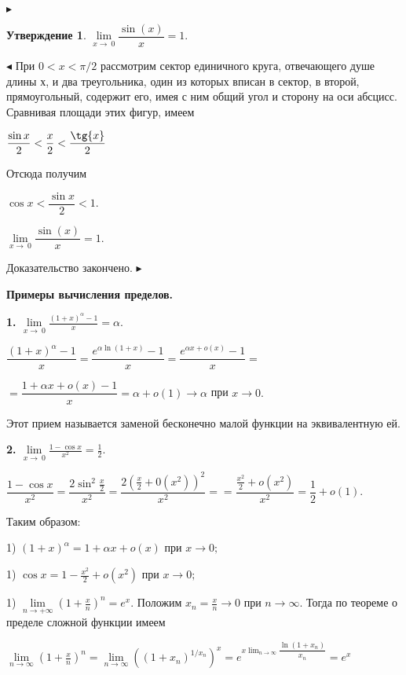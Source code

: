 \documentclass[12pt,titlepage]{report}
\newtheorem{approval}{Утверждение}
\begin{document}

  $\blacktriangleright$

\begin{approval}
$ \lim\limits_{x\to\ 0} \dfrac{\sin(x)}{x} = 1.$
\end{approval}
$\blacktriangleleft$ При $0<x<\pi /2$ рассмотрим сектор единичного круга, отвечающего душе длины $х$, и два треугольника, один из которых вписан в сектор, в второй, прямоугольный, содержит его, имея с ним общий угол и сторону на оси абсцисс. Сравнивая площади этих фигур, имеем
\begin{center}
$\dfrac {\sin{x}}{2}<\dfrac {x}{2}<\dfrac {\tg{x}}{2}$
\end{center}
Отсюда получим
\begin{center}
$\cos{x}<\dfrac {\sin{x}}{2}<1.$
\end{center}


\begin{center}
$\lim\limits_{x\to\ 0} \dfrac{\sin(x)}{x} = 1.$
\end{center}
Доказательство закончено.  $\blacktriangleright$

\bf{Примеры вычисления пределов.}

\bf{1.} \rm $\lim\limits_{x\to\ 0} \frac{(1+x)^{\alpha}-1}{x} = \alpha.$

\begin{center}
$ \dfrac{(1+x)^{\alpha}-1}{x}  =  \dfrac{e^{\alpha\ln(1+x)}-1}{x} = \dfrac{e^{\alpha x+o(x)}-1}{x}=$

 $= \dfrac{1+\alpha x + o(x)-1}{x} = \alpha+o(1) \rightarrow \alpha$ при $x \rightarrow 0.$

\end{center}
Этот прием называется заменой бесконечно малой функции на эквивалентную ей.


\bf{2.} \rm $\lim\limits_{x\to\ 0} \frac{1-\cos x}{x^2} = \frac{1}{2}.$

\begin{center}
$ \dfrac{1-\cos x}{x^2}  =  \dfrac{2\sin^2 \frac{x}{2}}{x^2} = \dfrac{2(\frac{x}{2}+0(x^2))^2}{x^2}= = \dfrac{\frac{x^2}{2}+o(x^2)}{x^2} = \dfrac{1}{2}+o(1). $
\end{center}
Таким образом:

1) $(1+x)^\alpha=1+\alpha x + o(x)$ при $x \rightarrow  0;$

1) $\cos x=1- \frac{x^2}{2} + o(x^2)$ при $x \rightarrow  0;$

1) $\lim\limits_{n\to+\infty} \left(1+\frac{x}{n}\right)^{n} = e^{x}.$ Положим $x_n=\frac{x}{n} \rightarrow 0$ при $n \rightarrow  \infty.$ Тогда по теореме о пределе сложной функции имеем
\begin{center}
$ \lim\limits_{n\to\infty} \left(1+\frac{x}{n}\right)^{n} = \lim\limits_{n\to\infty} \left((1+x_n)^{1/x_n}\right)^{x} = e^{x\lim_{n\to\infty} \dfrac{\ln(1+x_n)}{x_n}}= e^{x}  $
\end{center}
\end{document}
